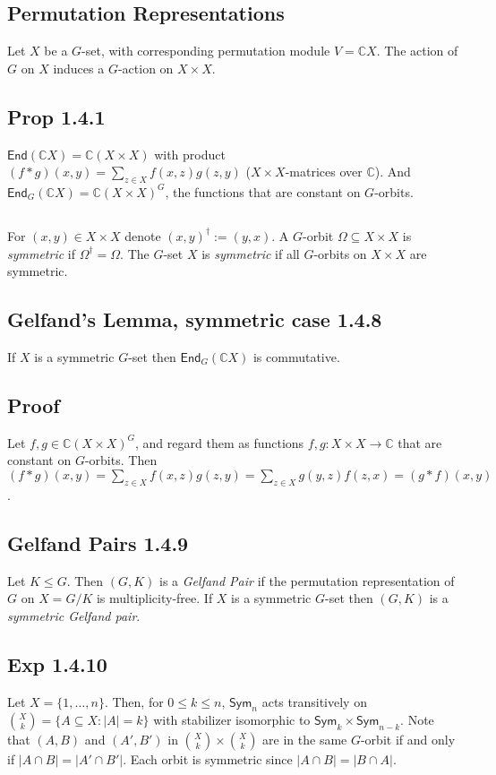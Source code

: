 \documentclass[a4paper]{amsart}
\newcommand{\C}{\mathbb{C}}
\newcommand{\Sym}{\mathsf{Sym}}
\newcommand{\End}{\mathsf{End}}
\newcommand{\Size}[1]{\left|#1\right|}
\begin{document}
\subsection{Permutation Representations}
Let $X$ be a $G$-set, with corresponding permutation module $V = \C X$.
The action of $G$ on $X$ induces a $G$-action on $X \times X$.

\subsection{Prop 1.4.1}
$\End(\C X) = \C (X \times X)$ with product $(f \ast g)(x, y) =
\sum_{z \in X} f(x, z) g(z, y)$ ($X \times X$-matrices over $\C$).
And $\End_G(\C X) = \C (X \times X)^G$, the functions that are
constant on $G$-orbits.

\subsection{}
For $(x, y) \in X \times X$ denote $(x, y)^{\dagger}:= (y, x)$.
A $G$-orbit $\Omega \subseteq X \times X$ is \emph{symmetric}
if $\Omega^{\dagger} = \Omega$.  The $G$-set $X$ is \emph{symmetric} if
all $G$-orbits on $X \times X$ are symmetric.


\subsection{Gelfand's Lemma, symmetric case 1.4.8}
If  $X$ is a symmetric $G$-set  then $\End_G(\C X)$ is commutative.

\subsection{Proof}
Let $f, g \in \C (X \times X)^G$, and regard them as functions
$f, g \colon X \times X \to \C$ that are constant on $G$-orbits.
Then $(f \ast g)(x, y) 
= \sum_{z \in X} f(x, z) g(z, y)
= \sum_{z \in X} g(y, z) f(z, x)
= (g \ast f)(x, y)$.

\subsection{Gelfand Pairs 1.4.9}
Let $K \leq G$.  Then $(G, K)$ is a \emph{Gelfand Pair} if the
permutation representation of $G$ on $X = G/K$ is multiplicity-free.
If $X$ is a symmetric $G$-set then $(G,K)$ is a \emph{symmetric
  Gelfand pair}.

\subsection{Exp 1.4.10}
Let $X = \{1, \dots,n\}$.  Then, for $0 \leq k \leq n$, 
$\Sym_n$ acts transitively on $\binom{X}{k} = \{A \subseteq X : \Size{A} = k\}$
with stabilizer isomorphic to $\Sym_k \times \Sym_{n-k}$.
Note that $(A, B)$ and $(A', B')$ in $\binom{X}{k} \times \binom{X}{k}$
are in the same $G$-orbit if and only if $\Size{A \cap B} = \Size{A' \cap B'}$.
Each orbit is symmetric since $\Size{A \cap B}  = \Size{B \cap A}$.
\end{document}
